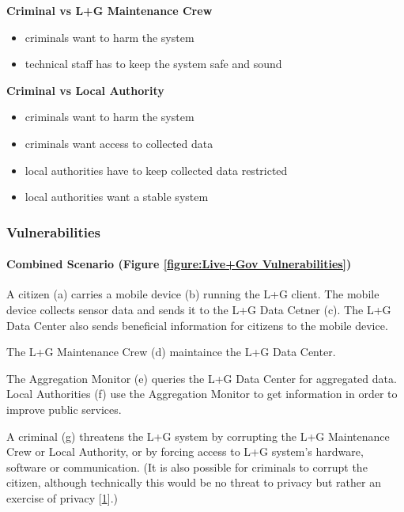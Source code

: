 \textbf{Criminal vs L+G Maintenance Crew}

\begin{itemize}
\itemsep1pt\parskip0pt
\item
  criminals want to harm the system
\item
  technical staff has to keep the system safe and sound
\end{itemize}

\textbf{Criminal vs Local Authority}

\begin{itemize}
\itemsep1pt\parskip0pt
\item
  criminals want to harm the system
\item
  criminals want access to collected data
\item
  local authorities have to keep collected data restricted
\item
  local authorities want a stable system
\end{itemize}

\subsubsection{Vulnerabilities}



\paragraph{Combined Scenario (Figure \ref{figure:Live+Gov Vulnerabilities})}

A citizen (a) carries a mobile device (b) running the L+G client. The
mobile device collects sensor data and sends it to the L+G Data Cetner
(c). The L+G Data Center also sends beneficial information for citizens
to the mobile device.

The L+G Maintenance Crew (d) maintaince the L+G Data Center.

The Aggregation Monitor (e) queries the L+G Data Center for aggregated
data. Local Authorities (f) use the Aggregation Monitor to get
information in order to improve public services.

A criminal (g) threatens the L+G system by corrupting the L+G
Maintenance Crew or Local Authority, or by forcing access to L+G
system's hardware, software or communication. (It is also possible for
criminals to corrupt the citizen, although technically this would be no
threat to privacy but rather an exercise of privacy
{[}\hyperref[references]{1}{]}.)

